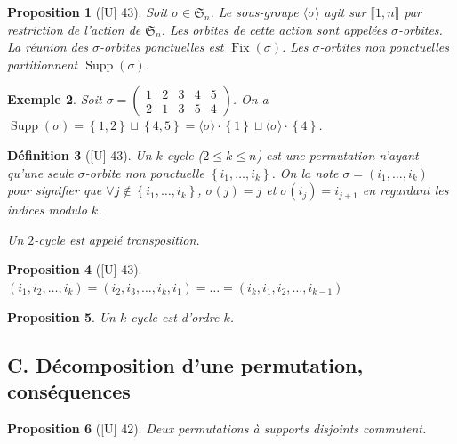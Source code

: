 \documentclass[10pt, a4paper, parskip=full, twoside, twocolumn]{report}
\newtheorem{definition}{Définition}
\newtheorem{proposition}[definition]{Proposition}
\newtheorem{example}[definition]{Exemple}
\DeclareMathOperator{\Fix}{Fix}
\DeclareMathOperator{\Supp}{Supp}
\begin{document}
\begin{proposition}[\textnormal{[U] 43}]
	Soit $\sigma \in \mathfrak{S}_n$. Le sous-groupe $\langle\sigma\rangle$ agit sur $\llbracket 1,n\rrbracket$ par restriction
	de l'action de $\mathfrak{S}_n$. Les orbites de cette action sont appelées \emph{$\sigma$-orbites}.
	La réunion des $\sigma$-orbites ponctuelles est $\Fix(\sigma)$. Les $\sigma$-orbites non ponctuelles partitionnent $\Supp(\sigma)$.
\end{proposition}

\begin{example}
	Soit $\sigma = \left(\begin{smallmatrix} 
			1 & 2 & 3 & 4 & 5 \\
			2 & 1 & 3 & 5 & 4
		\end{smallmatrix}\right)$.
	On a $\Supp(\sigma)=\left\{1,2\right\}\sqcup \left\{4,5\right\}=\langle\sigma\rangle\cdot \left\{1\right\}\sqcup \langle\sigma\rangle\cdot\left\{4\right\}$.
\end{example}

\begin{definition}[\textnormal{[U] 43}]
	Un \emph{$k$-cycle} ($2\leq k \leq n$) est une permutation n'ayant qu'une seule $\sigma$-orbite non ponctuelle $\left\{i_1,\dots,i_k\right\}$.
	On la note $\sigma = (i_1,\dots,i_k)$ pour signifier que 
	$\forall j\notin \left\{i_1,\dots,i_k\right\}$, $\sigma(j)=j$ et $\sigma(i_j)=i_{j+1}$ en regardant les indices modulo $k$.

	Un $2$-cycle est appelé \emph{transposition}.
\end{definition}

\begin{proposition}[\textnormal{[U] 43}]
	$(i_1,i_2,\dots,i_k) = (i_2,i_3,\dots,i_k,i_1)=\dots=(i_k,i_1,i_2,\dots,i_{k-1})$
\end{proposition}

\begin{proposition}
	Un $k$-cycle est d'ordre $k$.
\end{proposition}

\subsection*{C. Décomposition d'une permutation, conséquences}

\begin{proposition}[\textnormal{[U] 42}]
	Deux permutations à supports disjoints commutent.
\end{proposition}
\end{document}
